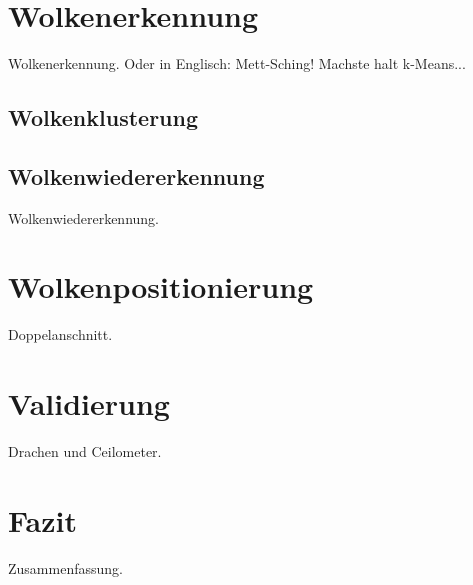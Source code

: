 \documentclass[a4paper,11pt,twoside,german]{article}
\newcommand{\literaturverzeichnis}[1]{
    \renewcommand{\harvardand}{und} %
    
    }
\begin{document}

\section{Wolkenerkennung}

Wolkenerkennung.
Oder in Englisch: Mett-Sching!
Machste halt k-Means...
\blindtext

\subsection{Wolkenklusterung}

\blindtext[3]



\subsection{Wolkenwiedererkennung}

Wolkenwiedererkennung.
\blindtext[3]




\section{Wolkenpositionierung}

Doppelanschnitt.
\blindtext[2]


\section{Validierung}

Drachen und Ceilometer.
\blindtext[3]




\section{Fazit}

Zusammenfassung.
\blindtext[3]


\literaturverzeichnis{bibliography.bib} %
\end{document}
